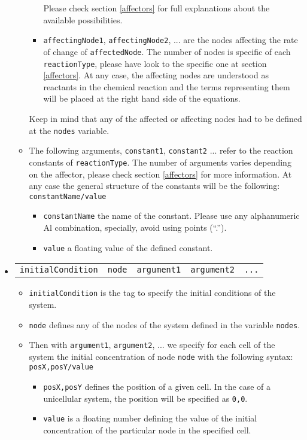 \documentclass[a4paper, 11pt]{article}
\begin{document}
\begin{itemize}
\begin{itemize}
\begin{itemize}
      Please check section \ref{affectors} for full explanations about the available possibilities.
    \item
      \texttt{affectingNode1}, \texttt{affectingNode2}, ... are the nodes affecting the rate of change of \texttt{affectedNode}.
      The number of nodes is specific of each \texttt{reactionType}, please have look to the specific one at section \ref{affectors}.
      At any case, the affecting nodes are understood as reactants in the chemical reaction and the terms representing them will be placed at the right hand side of the equations.
    \end{itemize}
    Keep in mind that any of the affected or affecting nodes had to be defined at the \texttt{nodes} variable.
  \item
    The following arguments, \texttt{constant1}, \texttt{constant2} ... refer to the reaction constants of \texttt{reactionType}.
    The number of arguments varies depending on the affector, please check section \ref{affectors} for more information.
    At any case the general structure of the constants will be the following:\\[1.5ex]
    \texttt{constantName/value}
    \begin{itemize}
    \item
      \texttt{constantName} the name of the constant. 
      Please use any alphanumeric Al combination, specially, avoid using points (``.'').
    \item
      \texttt{value} a floating value of the defined constant.
    \end{itemize}
  \end{itemize}
\item
  \begin{tabular}{ccccc}
    \texttt{initialCondition}&\texttt{node}&\texttt{argument1}&\texttt{argument2}&\texttt{...}
  \end{tabular}
  \begin{itemize}
  \item \texttt{initialCondition} is the tag to specify the initial conditions of the system.
  \item \texttt{node} defines any of the nodes of the system defined in the variable \texttt{nodes}.
  \item Then with \texttt{argument1}, \texttt{argument2}, ... we specify for each cell of the system the initial concentration of node \texttt{node} with the following syntax:\\[1.5ex]
    \texttt{posX,posY/value}
    \begin{itemize}
    \item \texttt{posX,posY} defines the position of a given cell. 
      In the case of a unicellular system, the position will be specified as \texttt{0,0}.
    \item \texttt{value} is a floating number defining the value of the initial concentration of the particular node in the specified cell.
    \end{itemize}
  \end{itemize}
\end{itemize}
\end{document}
